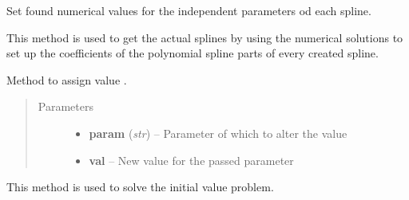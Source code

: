 \documentclass[letterpaper,10pt,english]{sphinxmanual}
\begin{document}
\begin{fulllineitems}
\begin{fulllineitems}
\end{fulllineitems}


\begin{fulllineitems}
\label{pytrajectory:pytrajectory.trajectory.Trajectory.setCoeff}
Set found numerical values for the independent parameters od each spline.

This method is used to get the actual splines by using the numerical
solutions to set up the coefficients of the polynomial spline parts of
every created spline.

\end{fulllineitems}


\begin{fulllineitems}
\label{pytrajectory:pytrajectory.trajectory.Trajectory.setParam}
Method to assign value .
\begin{quote}\begin{description}
\item[{Parameters}] \leavevmode\begin{itemize}
\item {} 
\textbf{param} (\emph{str}) -- Parameter of which to alter the value

\item {} 
\textbf{val} -- New value for the passed parameter

\end{itemize}

\end{description}\end{quote}

\end{fulllineitems}


\begin{fulllineitems}
\label{pytrajectory:pytrajectory.trajectory.Trajectory.simulate}
This method is used to solve the initial value problem.

\end{fulllineitems}



\end{fulllineitems}
\end{document}

